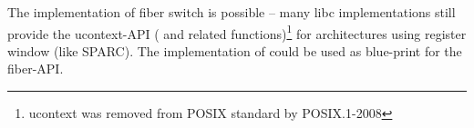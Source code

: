 
The implementation of fiber switch is possible -- many libc implementations
still provide the ucontext-API ( and related
functions)\footnote{ucontext was removed from POSIX standard by POSIX.1-2008}
for architectures using register window (like SPARC). The implementation of
 could be used as blue-print for the fiber-API.
